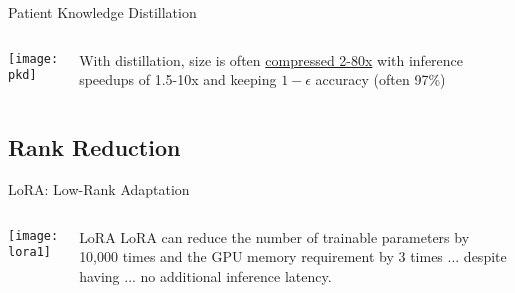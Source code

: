 \begin{frame}[c]{Patient Knowledge Distillation}
    \begin{columns}
        \begin{minipage}[c][\textheight][c]{\linewidth}
            \texttt{[image: pkd]} \\
        \end{minipage}
        \large
        \begin{minipage}[c][\textheight][c]{\linewidth}
            With distillation, size is often \underline{compressed 2-80x} with
            inference speedups of 1.5-10x and keeping $1-\epsilon$ accuracy
            (often 97\%)
        \end{minipage}
    \end{columns}
\end{frame}

\subsection{Rank Reduction}
\begin{frame}[c]{LoRA: Low-Rank Adaptation}
    \begin{columns}
        \begin{minipage}[c][\textheight][c]{\linewidth}
            \texttt{[image: lora1]} \\
        \end{minipage}
        \begin{minipage}[c][.8\textheight][c]{\linewidth}
            \large
            \begin{aquote}{LoRA \cite{hu_lora_2021}}
                LoRA can reduce the number of trainable parameters by 10,000
                times and the GPU memory requirement by 3 times ... despite
                having ... no additional inference latency.
            \end{aquote}
        \end{minipage}
    \end{columns}
\end{frame}

